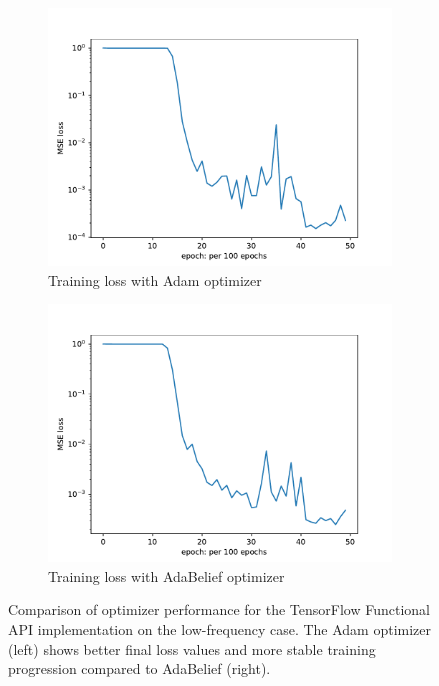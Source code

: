 \documentclass[10pt,journal,compsoc,onecolumn]{IEEEtran}
\begin{document}
\begin{figure}[htbp]
    \centering
    \begin{subfigure}[b]{0.45\textwidth}
        \includegraphics[width=\textwidth]{../../results/functional/low-frequency-adam-20250206-1105-1/loss}
        \caption{Training loss with Adam optimizer}
    \end{subfigure}
    \begin{subfigure}[b]{0.45\textwidth}
        \includegraphics[width=\textwidth]{../../results/functional/low-frequency-adabelief-20250206-1105-4/loss}
        \caption{Training loss with AdaBelief optimizer}
    \end{subfigure}
    \caption{Comparison of optimizer performance for the TensorFlow Functional API implementation on the low-frequency case. The Adam optimizer (left) shows better final loss values and more stable training progression compared to AdaBelief (right).}
    \label{fig:optimizer_comparison}
\end{figure}
\end{document}

